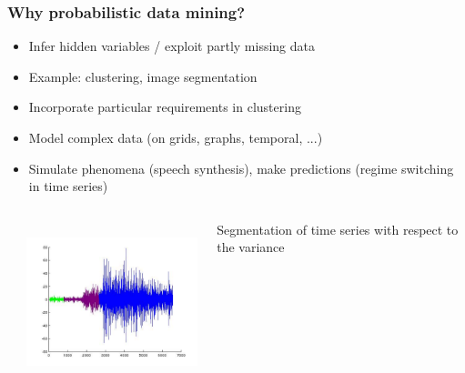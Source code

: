 \documentclass{beamer}
\begin{document}
\begin{frame} \frametitle{Why probabilistic data mining?}
\begin{itemize}
\item Infer hidden variables / exploit partly missing data
\item Example: clustering, image segmentation
\item Incorporate particular requirements in clustering
\item Model complex data (on grids, graphs, temporal, ...)
\item Simulate phenomena (speech synthesis), 
make predictions (regime switching in time series)
\end{itemize}
\begin{center}
	\begin{columns}
		\begin{column}{0.1\textwidth}
		\end{column}
		\begin{column}{0.5\textwidth}
			\includegraphics[height=4.7cm]{fig/R17F8S3P4.pdf}
		\end{column}
		\begin{column}{0.5\textwidth}
			Segmentation of time series with respect to the variance
		\end{column}
	\end{columns}
\end{center}

\end{frame}
\end{document}
